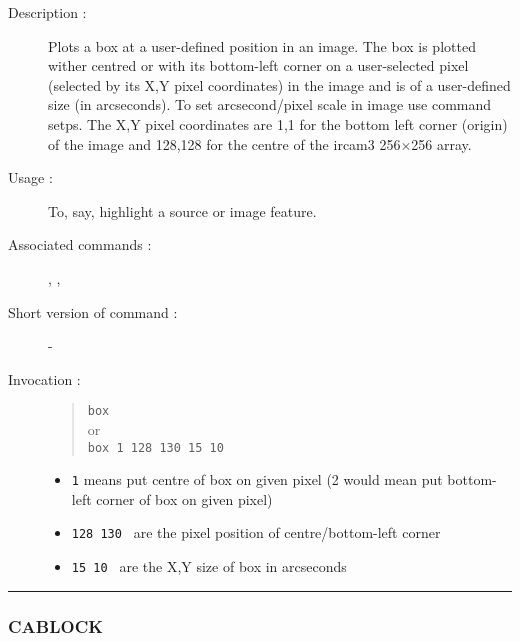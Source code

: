\begin{description}

\item[Description :] Plots a box at a user-defined position in an image. 
The box is plotted wither centred or with its bottom-left corner on a
user-selected pixel (selected by its X,Y pixel coordinates) in the image
and is of a user-defined size (in arcseconds).  To set arcsecond/pixel
scale in image use command setps.  The X,Y pixel coordinates are 1,1 for
the bottom left corner (origin) of the image and 128,128 for the centre of
the {\sc ircam3} 256$\times$256 array. 

\item[Usage :] To, say, highlight a source or image feature.
\item[Associated commands :] {\tt {}}, 
{\tt {}}, {\tt {}}
\item[Short version of command :] -
\item[Invocation :]

\begin{quote}{\tt  box }\\
or \\
{\tt box 1 128 130 15 10 }
\end{quote}

\begin{itemize}

\item {\tt 1} means put centre of box on given pixel
(2 would mean put bottom-left corner of box on given pixel)
\item {\tt 128 130 } are the pixel position of centre/bottom-left corner
\item {\tt 15 10 } are the X,Y size of box in arcseconds
\end{itemize}
\end{description}

\hrule 
\subsubsection*{\label{CABLOCK}CABLOCK}

